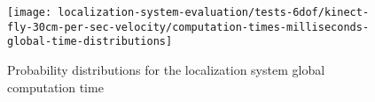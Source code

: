 \begin{figure}[H]
	\centering
	\texttt{[image: localization-system-evaluation/tests-6dof/kinect-fly-30cm-per-sec-velocity/computation-times-milliseconds-global-time-distributions]}
	\caption{Probability distributions for the localization system global computation time}
	\label{fig:localization-system-evaluation_kinect-fly-30cm-per-sec-velocity-computation-time}
\end{figure}
